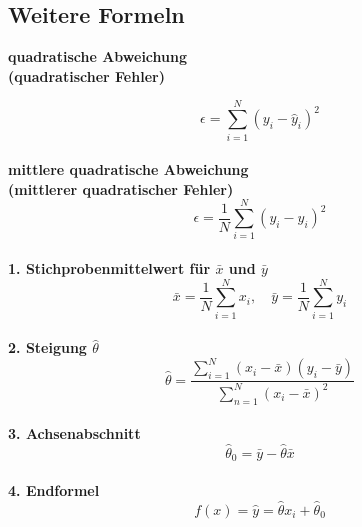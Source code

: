 \documentclass[12pt]{article}
\begin{document}
   \begin{minipage}[t]{0.45\textwidth}

         \subsection*{Weitere Formeln}

            \textbf{quadratische Abweichung} \\ 
            \textbf{(quadratischer Fehler)}

            \[
               \epsilon = \sum_{i = 1}^{N} (y_i - \hat{y}_i)^2 %
            \] \\

            \textbf{mittlere quadratische Abweichung} \\ 
            \textbf{(mittlerer quadratischer Fehler)}
            \[
               \epsilon = \frac{1}{N} \sum_{i = 1}^{N} (y_i - \hat{y}_i)^2 %
            \] \\

            \textbf{1. Stichprobenmittelwert für \(\bar{x}\) und \(\bar{y}\)} 
            \[
               \bar{x} = \frac{1}{N} \sum_{i=1}^{N} x_i, \quad \bar{y} = \frac{1}{N} \sum_{i=1}^{N} y_i
            \] \\

            \textbf{2. Steigung \(\hat{\theta}\)} \\
            \[
               \hat{\theta} = \frac{\sum_{i=1}^{N} (x_i - \bar{x})(y_i - \bar{y})}{\sum_{n = 1}^{N} (x_i - \bar{x})^2}  %
            \] \\

            \textbf{3. Achsenabschnitt}
            \[
               \hat{\theta}_0 = \bar{y} - \hat{\theta} \bar{x}
            \] \\

            \textbf{4. Endformel}
            \[
               f(x) = \hat{y} = \hat{\theta}x_i + \hat{\theta}_0
            \] \\
   
   \end{minipage}
\end{document}
